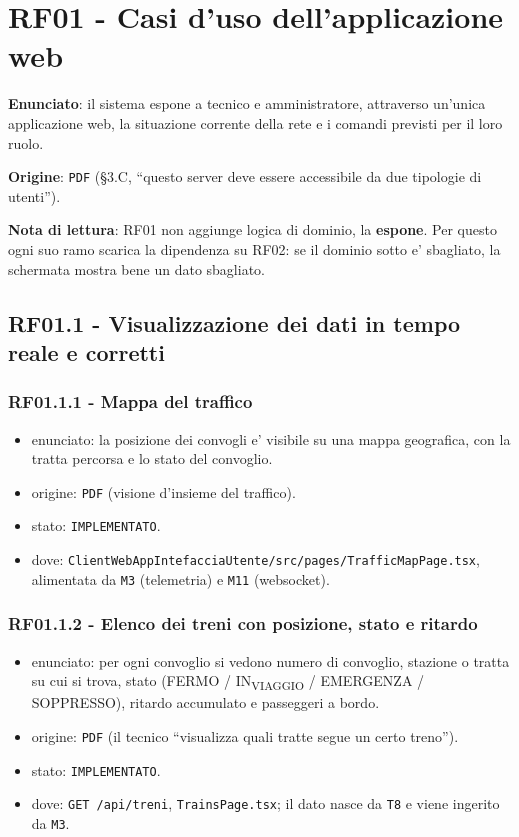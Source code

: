 \documentclass[11pt]{article}
\begin{document}
\section{RF01 - Casi d'uso dell'applicazione web}
\label{sec:org9e50fe3}

\textbf{Enunciato}: il sistema espone a tecnico e amministratore, attraverso un'unica applicazione web,
la situazione corrente della rete e i comandi previsti per il loro ruolo.

\textbf{Origine}: \texttt{PDF} (§3.C, ``questo server deve essere accessibile da due tipologie di utenti'').

\textbf{Nota di lettura}: RF01 non aggiunge logica di dominio, la \textbf{espone}. Per questo ogni suo ramo
scarica la dipendenza su RF02: se il dominio sotto e' sbagliato, la schermata mostra bene un dato
sbagliato.
\subsection{RF01.1 - Visualizzazione dei dati in tempo reale e corretti}
\label{sec:org4449077}

\subsubsection{RF01.1.1 - Mappa del traffico}
\label{sec:orgb2be27f}
\begin{itemize}
\item enunciato: la posizione dei convogli e' visibile su una mappa geografica, con la tratta percorsa
e lo stato del convoglio.
\item origine: \texttt{PDF} (visione d'insieme del traffico).
\item stato: \texttt{IMPLEMENTATO}.
\item dove: \texttt{ClientWebAppIntefacciaUtente/src/pages/TrafficMapPage.tsx}, alimentata da \texttt{M3} (telemetria)
e \texttt{M11} (websocket).
\end{itemize}
\subsubsection{RF01.1.2 - Elenco dei treni con posizione, stato e ritardo}
\label{sec:org158c9f7}
\begin{itemize}
\item enunciato: per ogni convoglio si vedono numero di convoglio, stazione o tratta su cui si trova,
stato (FERMO / IN\textsubscript{VIAGGIO} / EMERGENZA / SOPPRESSO), ritardo accumulato e passeggeri a bordo.
\item origine: \texttt{PDF} (il tecnico ``visualizza quali tratte segue un certo treno'').
\item stato: \texttt{IMPLEMENTATO}.
\item dove: \texttt{GET /api/treni}, \texttt{TrainsPage.tsx}; il dato nasce da \texttt{T8} e viene ingerito da \texttt{M3}.
\end{itemize}
\end{document}

